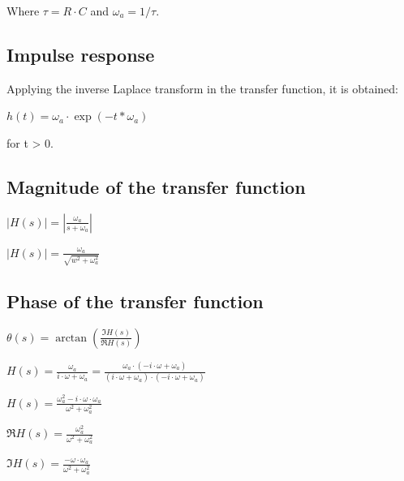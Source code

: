 \documentclass{article}
\begin{document}
Where $\tau = R \cdot C $ and $\omega_{a} = 1/ \tau$.

\subsection{Impulse response}

Applying the inverse Laplace transform in the transfer function, it is obtained:

\begin{question}
\centerline{$ h(t) = \omega_{a} \cdot \exp(-t * \omega_{a})
	$}
\end{question}

for t > 0.

\subsection{Magnitude of the transfer function}

\centerline{$ |H(s)| = |\frac{\omega_{a}}{s + \omega_{a}}|
	$}
\vspace{\baselineskip}

\begin{question}
\centerline{$ |H(s)| = \frac{\omega_{a}}{\sqrt{w^2 + \omega_{a}^2}}
	$}
\end{question}

\subsection{Phase of the transfer function}

\centerline{$ \theta(s) = \arctan{(\frac{\Im{H(s)}}{\Re{H(s)}})}
	$}
\vspace{\baselineskip}

\centerline{$ H(s) = \frac{\omega_{a}}{i\cdot \omega + \omega_{a}} = \frac{\omega_{a} \cdot (-i \cdot \omega + \omega_{a})}{(i \cdot \omega + \omega_{a}) \cdot (-i \cdot \omega + \omega_{a})}
	$}
\vspace{\baselineskip}

\centerline{$ H(s) = \frac{\omega_{a}^2 - i \cdot \omega \cdot \omega_{a}}{\omega^2 + \omega_{a}^2}
	$}
\vspace{\baselineskip}

\centerline{$ \Re{H(s)} = \frac{\omega_{a}^2}{\omega^2 + \omega_{a}^2}
	$}
\vspace{\baselineskip}

\centerline{$ \Im{H(s)} = \frac{-\omega \cdot \omega_{a}}{\omega^2 + \omega_{a}^2}
	$}
\vspace{\baselineskip}
\end{document}
